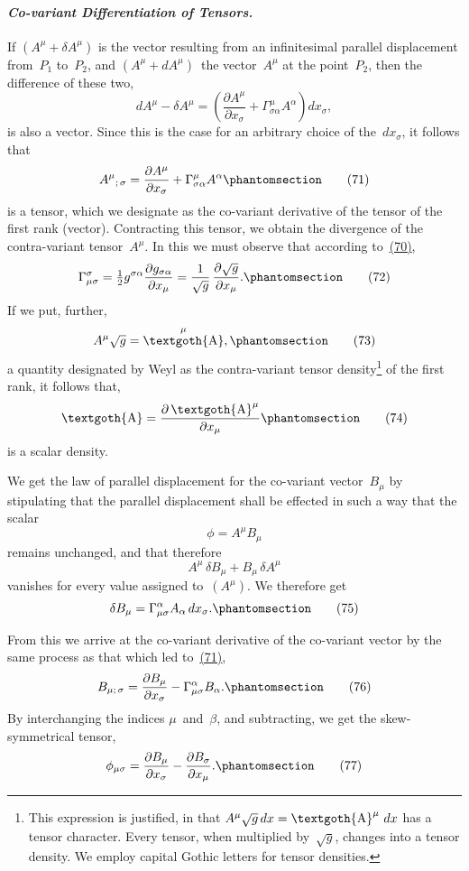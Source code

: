 \documentclass[12pt]{book}[2005/09/16]
\newcommand{\Paragraph}[1]{\paragraph*{\indent\normalfont\itshape#1}}
\newcommand{\Change}[2]{#2}
\newcommand{\Add}[1]{\Change{}{#1}}
\newcommand{\PageSep}[1]{\ignorespaces}
\newcommand{\Tag}[1]{%
  \phantomsection
  \label{eqn:#1}
  \tag*{#1}
}
\newcommand{\Eqref}[1]{\hyperref[eqn:#1]{#1}}
\newcommand{\dd}{\partial}
\newcommand{\Tensor}[1]{\textgoth{#1}}
\DeclareMathOperator{\tA}{\Tensor{A}}
\begin{document}
\Paragraph{Co-variant Differentiation of Tensors.} If $(A^{\mu} + \delta A^{\mu})$ is
%
the vector resulting from an infinitesimal parallel displacement
from~$P_{1}$ to~$P_{2}$, and $(A^{\mu} + dA^{\mu})$~the vector~$A^{\mu}$ at the
point~$P_{2}$, then the difference of these two,
\[
dA^{\mu} - \delta A^{\mu} = \left(
  \frac{\Change{\delta}{\dd} A^{\mu}}{\Change{\delta}{\dd} x_{\sigma}}
  + \Gamma_{\sigma\alpha}^{\mu} A^{\alpha}\right) dx_{\sigma}\Add{,}
\]
\PageSep{80}
is also a vector. Since this is the case for an arbitrary
choice of the~$dx_{\sigma}$, it follows that
\[
{A^{\mu}}_{;\, \sigma}
  = \frac{\dd A^{\mu}}{\dd x_{\sigma}} + \Gamma_{\sigma\alpha}^{\mu} A^{\alpha}
\Tag{(71)}
\]
is a tensor, which we designate as the co-variant derivative
of the tensor of the first rank (vector). Contracting this
tensor, we obtain the divergence of the contra-variant
tensor~$A^{\mu}$. In this we must observe that according to~\Eqref{(70)},
\[
\Gamma_{\mu\sigma}^{\sigma}
  = \tfrac{1}{2} g^{\sigma\alpha} \frac{\dd g_{\sigma\alpha}}{\dd x_{\mu}}
  = \frac{1}{\sqrt{g}}\, \frac{\dd \sqrt{g}}{\dd x_{\mu}}\Add{.}
\Tag{(72)}
\]
If we put, further,
\[
A^{\mu} \sqrt{g} = \tA^{\mu}\Add{,}
\Tag{(73)}
\]
a quantity designated by Weyl as the contra-variant tensor
density\footnote
  {This expression is justified, in that $A^{\mu}\sqrt{g}\, dx = \tA^{\mu}\, dx$ has a tensor
  character. Every tensor, when multiplied by~$\sqrt{g}$, changes into a tensor
  density. We employ capital Gothic letters for tensor densities.}
of the first rank, it follows that,
\[
\tA = \frac{\dd \tA^{\mu}}{\dd x_{\mu}}
\Tag{(74)}
\]
is a scalar density.

We get the law of parallel displacement for the
co-variant vector~$B_{\mu}$ by stipulating that the parallel
displacement shall be effected in such a way that the
scalar
\[
\phi = A^{\mu} B_{\mu}
\]
remains unchanged, and that therefore
\[
A^{\mu}\, \delta B_{\mu} + B_{\mu}\, \delta A^{\mu}
\]
\PageSep{81}
vanishes for every value assigned to~$(A^{\mu})$. We therefore
get
\[
\delta B_{\mu} = \Gamma_{\mu\sigma}^{\alpha} A_{\alpha}\, dx_{\sigma}\Add{.}
\Tag{(75)}
\]

From this we arrive at the co-variant derivative of the
co-variant vector by the same process as that which led
to~\Eqref{(71)},
\[
B_{\mu;\, \sigma}
  = \frac{\dd B_{\mu}}{\dd x_{\sigma}} - \Gamma_{\mu\sigma}^{\alpha} B_{\alpha}\Add{.}
\Tag{(76)}
\]
By interchanging the indices $\mu$~and~$\beta$, and subtracting,
we get the skew-symmetrical tensor,
\[
\phi_{\mu\sigma}
  = \frac{\dd B_{\mu}}{\dd x_{\sigma}} - \frac{\dd B_{\sigma}}{\dd x_{\mu}}\Add{.}
\Tag{(77)}
\]
\end{document}
